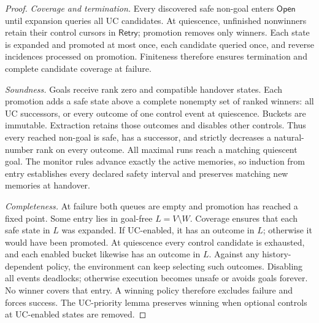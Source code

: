 \begin{proof}
\emph{Coverage and termination.} Every discovered safe non-goal enters $\mathsf{Open}$ until expansion queries all UC candidates. At quiescence, unfinished nonwinners retain their control cursors in $\mathsf{Retry}$; promotion removes only winners. Each state is expanded and promoted at most once, each candidate queried once, and reverse incidences processed on promotion. Finiteness therefore ensures termination and complete candidate coverage at failure.

\emph{Soundness.} Goals receive rank zero and compatible handover states. Each promotion adds a safe state above a complete nonempty set of ranked winners: all UC successors, or every outcome of one control event at quiescence. Buckets are immutable. Extraction retains those outcomes and disables other controls. Thus every reached non-goal is safe, has a successor, and strictly decreases a natural-number rank on every outcome. All maximal runs reach a matching quiescent goal. The monitor rules advance exactly the active memories, so induction from entry establishes every declared safety interval and preserves matching new memories at handover.

\emph{Completeness.} At failure both queues are empty and promotion has reached a fixed point. Some entry lies in goal-free $L=V\setminus W$. Coverage ensures that each safe state in $L$ was expanded. If UC-enabled, it has an outcome in $L$; otherwise it would have been promoted. At quiescence every control candidate is exhausted, and each enabled bucket likewise has an outcome in $L$. Against any history-dependent policy, the environment can keep selecting such outcomes. Disabling all events deadlocks; otherwise execution becomes unsafe or avoids goals forever. No winner covers that entry. A winning policy therefore excludes failure and forces success. The UC-priority lemma preserves winning when optional controls at UC-enabled states are removed.
\end{proof}

